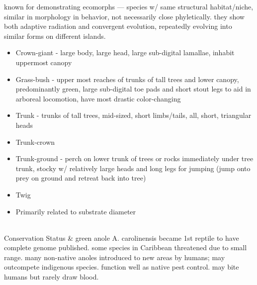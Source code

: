 \begin{center}
\begin{longtabu}
	known for demonstrating ecomorphs --- species w/ same structural habitat/niche, similar in morphology in behavior, not necessarily close phyletically. they show both adaptive radiation and convergent evolution, repeatedly evolving into similar forms on different islands.
	\begin{itemize}[noitemsep]
		\item Crown-giant - large body, large head, large sub-digital lamallae, inhabit uppermost canopy 
		\item Grass-bush - upper most reaches of trunks of tall trees and lower canopy, predominantly green, large sub-digital toe pads and short stout legs to aid in arboreal locomotion, have most drastic color-changing
		\item Trunk - trunks of tall trees, mid-sized, short limbs/tails, all, short, triangular heads
		\item Trunk-crown
		\item Trunk-ground - perch on lower trunk of trees or rocks immediately under tree trunk, stocky w/ relatively large heads and long legs for jumping (jump onto prey on ground and retreat back into tree)
		\item Twig
		\item Primarily related to substrate diameter
	\end{itemize}
	\\
	\hline
	Conservation Status & 
	green anole A. carolinensis became 1st reptile to have complete genome published. some species in Caribbean threatened due to small range. many non-native anoles introduced to new areas by humans; may outcompete indigenous species. function well as native pest control. may bite humans but rarely draw blood.
	\\
	\hline
\end{longtabu}
\end{center}
